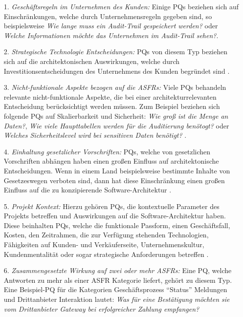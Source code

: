 \begin{itemize}
\item[1.] \textit{Gesch\"aftsregeln im Unternehmen des Kunden:} Einige PQs beziehen sich auf Einschr\"ankungen, welche durch Unternehmensregeln gegeben sind, so beispielsweise \textit{Wie lange muss ein Audit-Trail gespeichert werden?} oder \textit{Welche Informationen m\"ochte das Unternehmen im Audit-Trail sehen?}\cite{Ros02}.
\item[2.] \textit{Strategische Technologie Entscheidungen:} PQs von diesem Typ beziehen sich auf die architektonischen Auswirkungen, welche durch Investitionsentscheidungen des Unternehmens des Kunden begr\"undet sind \cite{Ros02}.
\item[3.] \textit{Nicht-funktionale Aspekte bezogen auf die ASFRs:} Viele PQs behandeln relevante nicht-funktionale Aspekte, die bei einer architekturrelevanten Entscheidung ber\"ucksichtigt werden m\"ussen. Zum Beispiel beziehen sich folgende PQs auf Skalierbarkeit und Sicherheit: \textit{Wie gro\ss{} ist die Menge an Daten?}, \textit{Wie viele Haupttabellen werden f\"ur die Auditierung ben\"otogt?} oder \textit{Welches Sicherheitslevel wird bei sensitiven Daten ben\"otigt?} \cite{Ros02}.
\item[4.] \textit{Einhaltung gesetzlicher Vorschriften:} PQs, welche von gesetzlichen Vorschriften abh\"angen haben einen gro\ss{}en Einfluss auf architektonische Entscheidungen. Wenn in einem Land beispielsweise bestimmte Inhalte von Gesetzeswegen verboten sind, dann hat diese Einschr\"ankung einen gro\ss{}en Einfluss auf die zu konzipierende Software-Architektur \cite{Ros02}.
\item[5.] \textit{Projekt Kontext:} Hierzu geh\"oren PQs, die kontextuelle Parameter des Projekts betreffen und Auswirkungen auf die Software-Architektur haben. Diese beinhalten PQs, welche die funktionale Passform, einen Gesch\"aftsfall, Kosten, den Zeitrahmen, die zur Verf\"ugung stehenden Technologien, F\"ahigkeiten auf Kunden- und Verk\"auferseite, Unternehmenskultur, Kundenmentalit\"at oder sogar strategische Anforderungen betreffen \cite{Ros02}.
\item[6.] \textit{Zusammengesetzte Wirkung auf zwei oder mehr ASFRs:} Eine PQ, welche Antworten zu mehr als einer ASFR Kategorie liefert, geh\"ort zu diesem Typ. Eine Beispiel-PQ f\"ur die Kategorien Gesch\"aftsprozess  ``Status'' Meldungen und Drittanbieter Interaktion lautet: \textit{Was f\"ur eine Best\"atigung m\"ochten sie vom Drittanbieter Gateway bei erfolgreicher Zahlung empfangen?} \cite{Ros02} \\
\end{itemize}

